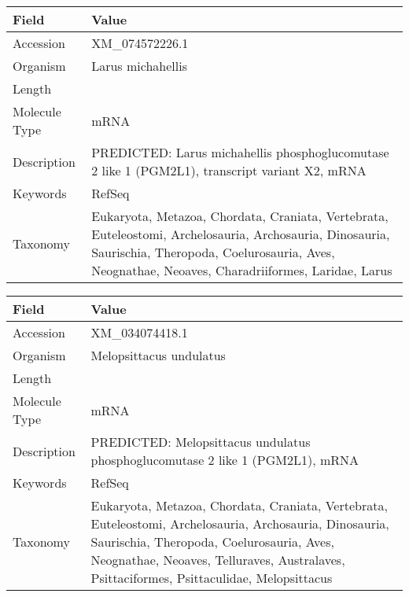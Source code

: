 \documentclass[10pt]{article}
\begin{document}
\vspace{1em}
{\footnotesize
\begin{longtable}{>{\raggedright\arraybackslash}p{4.5cm} >{\raggedright\arraybackslash}p{11.5cm}}
\textbf{Field} & \textbf{Value} \\
\hline
Accession & XM\_074572226.1 \\
Organism & Larus michahellis \\
Length & 3260 \\
Molecule Type & mRNA \\
Description & PREDICTED: Larus michahellis phosphoglucomutase 2 like 1 (PGM2L1), transcript variant X2, mRNA \\
Keywords & RefSeq \\
Taxonomy & Eukaryota, Metazoa, Chordata, Craniata, Vertebrata, Euteleostomi, Archelosauria, Archosauria, Dinosauria, Saurischia, Theropoda, Coelurosauria, Aves, Neognathae, Neoaves, Charadriiformes, Laridae, Larus \\
\end{longtable}
}

\vspace{1em}
{\footnotesize
\begin{longtable}{>{\raggedright\arraybackslash}p{4.5cm} >{\raggedright\arraybackslash}p{11.5cm}}
\textbf{Field} & \textbf{Value} \\
\hline
Accession & XM\_034074418.1 \\
Organism & Melopsittacus undulatus \\
Length & 2949 \\
Molecule Type & mRNA \\
Description & PREDICTED: Melopsittacus undulatus phosphoglucomutase 2 like 1 (PGM2L1), mRNA \\
Keywords & RefSeq \\
Taxonomy & Eukaryota, Metazoa, Chordata, Craniata, Vertebrata, Euteleostomi, Archelosauria, Archosauria, Dinosauria, Saurischia, Theropoda, Coelurosauria, Aves, Neognathae, Neoaves, Telluraves, Australaves, Psittaciformes, Psittaculidae, Melopsittacus \\
\end{longtable}
}
\end{document}
